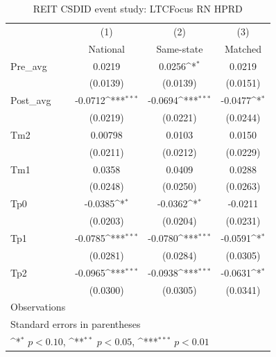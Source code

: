 \begin{table}[htbp]\centering
\def\sym#1{\ifmmode^{#1}\else\(^{#1}\)\fi}
\caption{REIT CSDID event study: LTCFocus RN HPRD}
\begin{tabular}{l*{3}{c}}
\hline\hline
                    &\multicolumn{1}{c}{(1)}&\multicolumn{1}{c}{(2)}&\multicolumn{1}{c}{(3)}\\
                    &\multicolumn{1}{c}{National}&\multicolumn{1}{c}{Same-state}&\multicolumn{1}{c}{Matched}\\
\hline
Pre\_avg             &      0.0219         &      0.0256\sym{*}  &      0.0219         \\
                    &    (0.0139)         &    (0.0139)         &    (0.0151)         \\
[1em]
Post\_avg            &     -0.0712\sym{***}&     -0.0694\sym{***}&     -0.0477\sym{*}  \\
                    &    (0.0219)         &    (0.0221)         &    (0.0244)         \\
[1em]
Tm2                 &     0.00798         &      0.0103         &      0.0150         \\
                    &    (0.0211)         &    (0.0212)         &    (0.0229)         \\
[1em]
Tm1                 &      0.0358         &      0.0409         &      0.0288         \\
                    &    (0.0248)         &    (0.0250)         &    (0.0263)         \\
[1em]
Tp0                 &     -0.0385\sym{*}  &     -0.0362\sym{*}  &     -0.0211         \\
                    &    (0.0203)         &    (0.0204)         &    (0.0231)         \\
[1em]
Tp1                 &     -0.0785\sym{***}&     -0.0780\sym{***}&     -0.0591\sym{*}  \\
                    &    (0.0281)         &    (0.0284)         &    (0.0305)         \\
[1em]
Tp2                 &     -0.0965\sym{***}&     -0.0938\sym{***}&     -0.0631\sym{*}  \\
                    &    (0.0300)         &    (0.0305)         &    (0.0341)         \\
\hline
Observations        &                     &                     &                     \\
\hline\hline
\multicolumn{4}{l}{\footnotesize Standard errors in parentheses}\\
\multicolumn{4}{l}{\footnotesize \sym{*} \(p<0.10\), \sym{**} \(p<0.05\), \sym{***} \(p<0.01\)}\\
\end{tabular}
\end{table}
